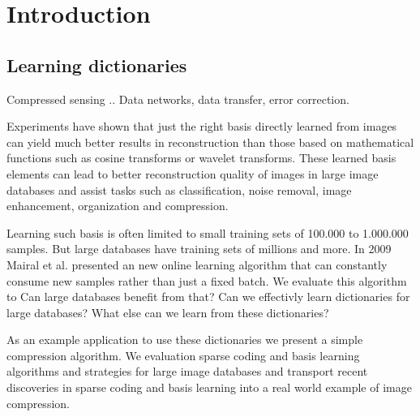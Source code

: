 \chapter{Introduction}
\label{sec:introduction}
\section{Learning dictionaries}

Compressed sensing .. Data networks, data transfer, error correction. 

Experiments \cite{Chen1998,Elad2006} have shown that just the right basis
directly learned from images can yield much better results in reconstruction
than those based on mathematical functions such as cosine transforms or
wavelet transforms. These learned basis elements can lead to better
reconstruction quality of images in large image databases and assist tasks such
as classification, noise removal, image enhancement, organization and
compression.

Learning such basis is often limited to small training sets of 100.000 to
1.000.000 samples. But large databases have training sets of millions and more.
In 2009 Mairal et al.\cite{Mairal2009} presented an new online learning
algorithm that can constantly consume new samples rather than just a fixed
batch.  We evaluate this algorithm to 
Can large databases benefit from that? Can we effectivly learn dictionaries for
large databases? What else can we learn from these dictionaries?

As an example application to use these dictionaries we present a simple 
compression algorithm. We evaluation sparse coding and basis learning algorithms
and strategies for large image databases and transport recent discoveries in
sparse coding and basis learning into a real world example of image compression.

